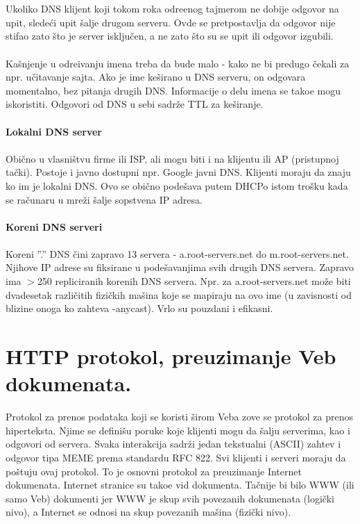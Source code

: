 \documentclass{article} %
\begin{document}
\\
\\ Ukoliko DNS klijent koji tokom roka odre\dj enog tajmerom ne dobije odgovor na upit, slede\' ci upit \v salje drugom serveru. Ovde se pretpostavlja da odgovor nije stifao zato \v sto je server isklju\v cen, a ne zato \v sto su se upit ili odgovor izgubili.
\\
\\ Ka\v snjenje u odre\dj ivanju imena treba da bude malo - kako ne bi predugo \v cekali za npr. u\v citavanje sajta. Ako je ime ke\v sirano u DNS serveru, on odgovara momentalno, bez pitanja drugih DNS. Informacije o delu imena se tako\dj e mogu iskoristiti. Odgovori od DNS u sebi sadr\v ze TTL za ke\v siranje.
\\
\\\textbf{Lokalni DNS server}
\\
\\ Obi\v cno u vlasni\v stvu firme ili ISP, ali mogu biti i na klijentu ili AP (pristupnoj ta\v cki). Postoje i javno dostupni npr. Google javni DNS. Klijenti moraju da znaju ko im je lokalni DNS. Ovo se obi\v cno pode\v sava putem DHCPo istom tro\v sku kada se ra\v cunaru u mre\v zi \v salje sopstvena IP adresa.
\\
\\ \textbf{Koreni DNS serveri}
\\
\\ Koreni ''.'' DNS \v cini zapravo 13 servera - a.root-servers.net do m.root-servers.net. Njihove IP adrese su fiksirane u pode\v savanjima svih drugih DNS servera. Zapravo ima $>$250 repliciranih korenih DNS servera. Npr. za a.root-servers.net mo\v ze biti dvadesetak razli\v citih fizi\v ckih ma\v sina koje se mapiraju na ovo ime (u zavisnosti od blizine onoga ko zahteva -anycast). Vrlo su pouzdani i efikasni.




%
%

\section{HTTP protokol, preuzimanje Veb dokumenata.}

Protokol za prenos podataka koji se koristi \v sirom Veba zove se protokol za prenos hiperteksta. Njime se defini\v su poruke koje klijenti mogu da \v salju serverima, kao i odgovori od servera. Svaka interakcija sadr\v zi jedan tekstualni (ASCII) zahtev i odgovor tipa MEME prema standardu RFC 822. Svi klijenti i serveri moraju da po\v stuju ovaj protokol. To je osnovni protokol za preuzimanje Internet dokumenata. Internet stranice su tako\dj e vid dokumenta. Ta\v cnije bi bilo WWW (ili samo Veb) dokumenti jer WWW je skup svih povezanih dokumenata (logi\v cki nivo), a Internet se odnosi na skup povezanih ma\v sina (fizi\v cki nivo).
\end{document}
